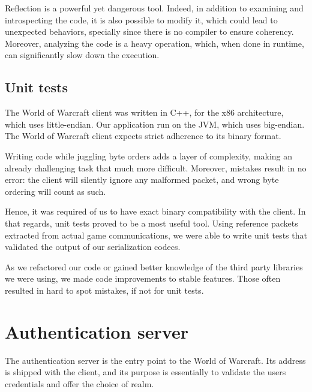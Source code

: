 \documentclass[paper=a4, fontsize=11pt]{scrartcl}
\begin{document}
Reflection is a powerful yet dangerous tool.
Indeed, in addition to examining and introspecting the code, it is also possible
to modify it, which could lead to unexpected behaviors, specially since there is
no compiler to ensure coherency.
Moreover, analyzing the code is a heavy operation, which, when done in runtime,
can significantly slow down the execution.

\subsection{Unit tests}

The World of Warcraft client was written in C++, for the x86 architecture, which
uses little-endian. 
Our application run on the JVM, which uses big-endian.
The World of Warcraft client expects strict adherence to its binary format.

Writing code while juggling byte orders adds a layer of complexity, making an
already challenging task that much more difficult.
Moreover, mistakes result in no error: the client will silently ignore any
malformed packet, and wrong byte ordering will count as such.

Hence, it was required of us to have exact binary compatibility with the client.
In that regards, unit tests proved to be a most useful tool.
Using reference packets extracted from actual game communications, we were able
to write unit tests that validated the output of our serialization codecs.

As we refactored our code or gained better knowledge of the third party
libraries we were using, we made code improvements to stable
features.
Those often resulted in hard to spot mistakes, if not for unit tests.


\section{Authentication server}

The authentication server is the entry point to the World of Warcraft.  
Its address is shipped with the client, and its purpose is essentially to
validate the users credentials and offer the choice of realm.
\end{document}
